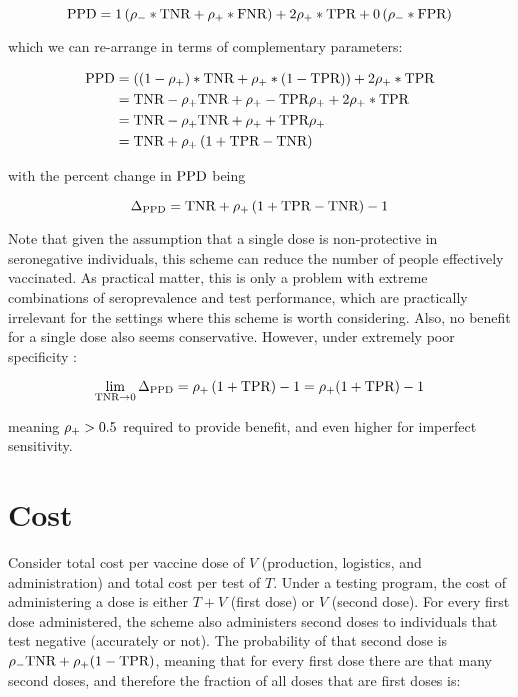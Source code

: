 \documentclass{article}
\begin{document}
$$
\textrm{PPD} = 1\left(\rho_{{-}} * \textrm{TNR} + \rho_{{+}} * \textrm{FNR} \right) + 2\rho_{{+}}*\textrm{TPR} + 0\left(\rho_{{-}} * \textrm{FPR}\right)
$$

which we can re-arrange in terms of complementary parameters:

\begin{equation}\label{ppd}
\begin{aligned}
\textrm{PPD} &= \left((1-\rho_{{+}}) * \textrm{TNR} + \rho_{{+}} * (1-\textrm{TPR}) \right) + 2\rho_{{+}}*\textrm{TPR} \\
&= \textrm{TNR}-\rho_{{+}}\textrm{TNR} + \rho_{{+}} - \textrm{TPR}\rho_{{+}} + 2\rho_{{+}}*\textrm{TPR} \\
&= \textrm{TNR} - \rho_{{+}}\textrm{TNR} + \rho_{{+}} + \textrm{TPR}\rho_{{+}} \\
&= \textrm{TNR} + \rho_{{+}} \left(1 + \textrm{TPR}-\textrm{TNR}\right)
\end{aligned}
\end{equation}

with the percent change in $\textrm{PPD}$ being

$$
\Delta_{\textrm{PPD}} = \textrm{TNR} + \rho_{{+}} \left(1 + \textrm{TPR}-\textrm{TNR}\right) - 1
$$

Note that given the assumption that a single dose is non-protective in seronegative individuals, this scheme can reduce the number of people effectively vaccinated. As practical matter, this is only a problem with extreme combinations of seroprevalence and test performance, which are practically irrelevant for the settings where this scheme is worth considering. Also, no benefit for a single dose also seems conservative. However, under extremely poor specificity \eg*:

$$
\lim_{\textrm{TNR}\rightarrow 0}\Delta_{\textrm{PPD}} = \rho_{{+}} \left(1 + \textrm{TPR}\right) - 1 = \rho_{{+}}(1+\textrm{TPR}) - 1 
$$

meaning $\rho_{{+}} > 0.5$ required to provide benefit, and even higher for imperfect sensitivity.

\section{Cost}

Consider total cost per vaccine dose of $V$ (\ie* production, logistics, and administration) and total cost per test of $T$. Under a testing program, the cost of administering a dose is either $T+V$ (first dose) or $V$ (second dose). For every first dose administered, the scheme also administers second doses to individuals that test negative (accurately or not). The probability of that second dose is $\rho_{{-}}\textrm{TNR} + \rho_{{+}}(1-\textrm{TPR})$, meaning that for every first dose there are that many second doses, and therefore the fraction of all doses that are first doses is:
\end{document}
